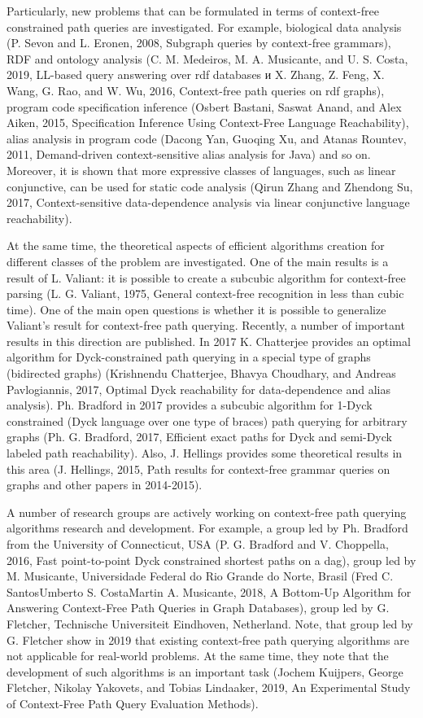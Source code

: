\documentclass[12pt]{article}  %
\theoremstyle{remark}
\begin{document}
Particularly, new problems that can be formulated in terms of context-free constrained path queries are investigated. For example, biological data analysis (P. Sevon and L. Eronen, 2008, Subgraph queries by context-free grammars), RDF and ontology analysis (C. M. Medeiros, M. A. Musicante, and U. S. Costa, 2019, LL-based query answering over rdf databases и X. Zhang, Z. Feng, X. Wang, G. Rao, and W. Wu, 2016, Context-free path queries on rdf graphs), program code specification inference (Osbert Bastani, Saswat Anand, and Alex Aiken, 2015, Specification Inference Using Context-Free Language Reachability), alias analysis in program code (Dacong Yan, Guoqing Xu, and Atanas Rountev, 2011, Demand-driven context-sensitive alias analysis for Java) and so on. Moreover, it is shown that more expressive classes of languages, such as linear conjunctive, can be used for static code analysis (Qirun Zhang and Zhendong Su, 2017, Context-sensitive data-dependence analysis via linear conjunctive language reachability).

At the same time, the theoretical aspects of efficient algorithms creation for different classes of the problem are investigated. One of the main results is a result of L. Valiant: it is possible to create a subcubic algorithm for context-free parsing (L. G. Valiant, 1975, General context-free recognition in less than cubic time). One of the main open questions is whether it is possible to generalize Valiant's result for context-free path querying. Recently, a number of important results in this direction are published. In 2017 K. Chatterjee provides an optimal algorithm for Dyck-constrained path querying in a special type of graphs (bidirected graphs) (Krishnendu Chatterjee, Bhavya Choudhary, and Andreas Pavlogiannis, 2017, Optimal Dyck reachability for data-dependence and alias analysis). Ph. Bradford in 2017 provides a subcubic algorithm for 1-Dyck constrained (Dyck language over one type of braces) path querying for arbitrary graphs (Ph. G. Bradford, 2017, Efficient exact paths for Dyck and semi-Dyck labeled path reachability). Also, J. Hellings provides some theoretical results in this area (J. Hellings, 2015, Path results for context-free grammar queries on graphs and other papers in 2014-2015).

A number of research groups are actively working on context-free path querying algorithms research and development. For example, a group led by Ph. Bradford from the University of Connecticut, USA (P. G. Bradford and V. Choppella, 2016, Fast point-to-point Dyck constrained shortest paths on a dag), group led by M. Musicante, Universidade Federal do Rio Grande do Norte, Brasil (Fred C. SantosUmberto S. CostaMartin A. Musicante, 2018, A Bottom-Up Algorithm for Answering Context-Free Path Queries in Graph Databases), group led by G. Fletcher, Technische Universiteit Eindhoven, Netherland. Note, that group led by G. Fletcher show in 2019 that existing context-free path querying algorithms are not applicable for real-world problems. At the same time, they note that the development of such algorithms is an important task (Jochem Kuijpers, George Fletcher, Nikolay Yakovets, and Tobias Lindaaker, 2019, An Experimental Study of Context-Free Path Query Evaluation Methods).
\end{document}
